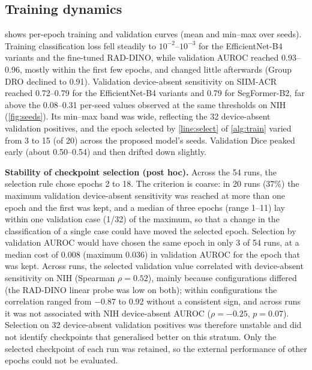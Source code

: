 \documentclass{ieeeaccess}
\begin{document}
\subsection{Training dynamics}
\label{sec:res-conv}
 shows per-epoch training and validation curves (mean and min--max over seeds). Training classification loss fell steadily to $10^{-2}$--$10^{-3}$ for the EfficientNet-B4 variants and the fine-tuned RAD-DINO, while validation AUROC reached 0.93--0.96, mostly within the first few epochs, and changed little afterwards (Group DRO declined to 0.91). Validation device-absent sensitivity on SIIM-ACR reached 0.72--0.79 for the EfficientNet-B4 variants and 0.79 for SegFormer-B2, far above the 0.08--0.31 per-seed values observed at the same thresholds on NIH (\cref{fig:seeds}). Its min--max band was wide, reflecting the 32 device-absent validation positives, and the epoch selected by \cref{line:select} of \cref{alg:train} varied from 3 to 15 (of 20) across the proposed model's seeds. Validation Dice peaked early (about 0.50--0.54) and then drifted down slightly.

\textbf{Stability of checkpoint selection (post hoc).} Across the 54 runs, the selection rule chose epochs 2 to 18. The criterion is coarse: in 20 runs (37\%) the maximum validation device-absent sensitivity was reached at more than one epoch and the first was kept, and a median of three epochs (range 1--11) lay within one validation case (1/32) of the maximum, so that a change in the classification of a single case could have moved the selected epoch. Selection by validation AUROC would have chosen the same epoch in only 3 of 54 runs, at a median cost of 0.008 (maximum 0.036) in validation AUROC for the epoch that was kept. Across runs, the selected validation value correlated with device-absent sensitivity on NIH (Spearman $\rho=0.52$), mainly because configurations differed (the RAD-DINO linear probe was low on both); within configurations the correlation ranged from $-$0.87 to 0.92 without a consistent sign, and across runs it was not associated with NIH device-absent AUROC ($\rho=-0.25$, $p=0.07$). Selection on 32 device-absent validation positives was therefore unstable and did not identify checkpoints that generalised better on this stratum. Only the selected checkpoint of each run was retained, so the external performance of other epochs could not be evaluated.
\end{document}
